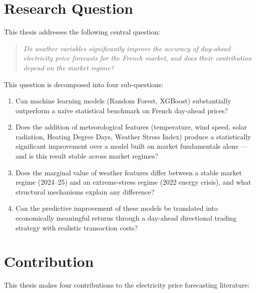\section{Research Question}

This thesis addresses the following central question:

\begin{quote}
\textit{Do weather variables significantly improve the accuracy of day-ahead
electricity price forecasts for the French market, and does their contribution
depend on the market regime?}
\end{quote}

This question is decomposed into four sub-questions:

\begin{enumerate}
  \item Can machine learning models (Random Forest, XGBoost) substantially
  outperform a na\"{i}ve statistical benchmark on French day-ahead prices?
  \item Does the addition of meteorological features (temperature, wind speed,
  solar radiation, Heating Degree Days, Weather Stress Index) produce a
  statistically significant improvement over a model built on market
  fundamentals alone — and is this result stable across market regimes?
  \item Does the marginal value of weather features differ between a stable
  market regime (2024--25) and an extreme-stress regime (2022 energy crisis),
  and what structural mechanisms explain any difference?
  \item Can the predictive improvement of these models be translated into
  economically meaningful returns through a day-ahead directional trading
  strategy with realistic transaction costs?
\end{enumerate}

\section{Contribution}

This thesis makes four contributions to the electricity price forecasting
literature:

